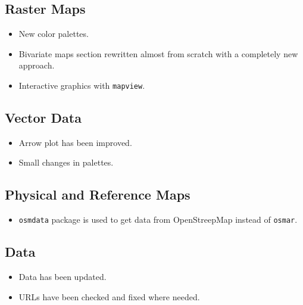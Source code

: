 \documentclass[11pt]{article}
\begin{document}
\subsection*{Raster Maps}
\label{sec:org91de74a}

\begin{itemize}
\item New color palettes.

\item Bivariate maps section rewritten almost from scratch with a completely new approach.

\item Interactive graphics with \texttt{mapview}.
\end{itemize}

\subsection*{Vector Data}
\label{sec:org0eb865f}
\begin{itemize}
\item Arrow plot has been improved.
\item Small changes in palettes.
\end{itemize}

\subsection*{Physical and Reference Maps}
\label{sec:org6cb3009}
\begin{itemize}
\item \texttt{osmdata} package is used to get data from OpenStreepMap instead of \texttt{osmar}.
\end{itemize}
\subsection*{Data}
\label{sec:orgea75ec2}
\begin{itemize}
\item Data has been updated.
\item URLs have been checked and fixed where needed.
\end{itemize}
\end{document}
